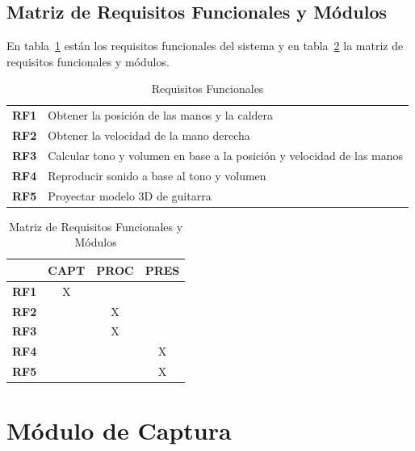 \documentclass[a4paper,12pt]{article}
\begin{document}
\subsection{Matriz de Requisitos Funcionales y Módulos}
En tabla~\ref{tab:req_func} están los requisitos funcionales del sistema y en
tabla~\ref{tab:matriz} la matriz de requisitos funcionales y módulos.
\begin{table}[hpb]
        \centering
        \begin{tabularx}{0.8\textwidth}{p{8mm} X}
                \textbf{RF1} & Obtener la posición de las manos y la caldera \\
                \textbf{RF2} & Obtener la velocidad de la mano derecha \\
                \textbf{RF3} & Calcular tono y volumen en base a la posición y velocidad de las manos \\
                \textbf{RF4} & Reproducir sonido a base al tono y volumen \\
                \textbf{RF5} & Proyectar modelo 3D de guitarra \\
        \end{tabularx}
        \caption{Requisitos Funcionales}
        \label{tab:req_func}
\end{table}
\begin{table}[hpb]
        \centering
        \begin{tabular}{|p{8mm}|c|c|c|}
                \hline
                & \textbf{CAPT} & \textbf{PROC} & \textbf{PRES} \\
                \hline
                \textbf{RF1} & X & & \\
                \hline
                \textbf{RF2} & & X & \\
                \hline
                \textbf{RF3} & & X & \\
                \hline
                \textbf{RF4} & & & X \\
                \hline
                \textbf{RF5} & & & X \\
                \hline
        \end{tabular}
        \caption{Matriz de Requisitos Funcionales y Módulos}
        \label{tab:matriz}
\end{table}
\section{Módulo de Captura}
\label{sec:captura}
\end{document}
